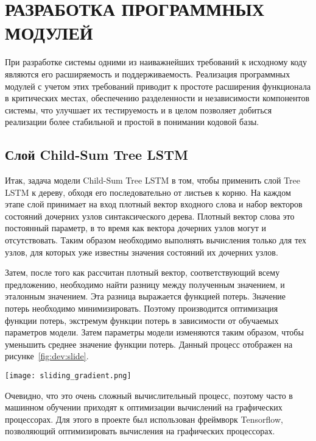 \section{РАЗРАБОТКА ПРОГРАММНЫХ МОДУЛЕЙ}
\label{sec:development}
При разработке системы одними из наиважнейших требований к исходному коду являются его расширяемость и поддерживаемость. Реализация программных модулей с учетом этих требований приводит к простоте расширения функционала в критических местах, обеспечению разделенности и независимости компонентов системы, что улучшает их тестируемость и в целом позволяет добиться реализации более стабильной и простой в понимании кодовой базы.

\subsection{Слой Child-Sum Tree LSTM}
Итак, задача модели Child-Sum Tree LSTM в том, чтобы применить слой Tree LSTM к дереву, обходя его последовательно от листьев к корню. На каждом этапе слой принимает на вход плотный вектор входного слова и набор векторов состояний дочерних узлов синтаксического дерева. Плотный вектор слова это постоянный параметр, в то время как вектора дочерних узлов могут и отсутствовать. Таким образом необходимо выполнять вычисления только для тех узлов, для которых уже известны значения состояний их дочерних узлов.

Затем, после того как рассчитан плотный вектор, соответствующий всему предложению, необходимо найти разницу между полученным значением, и эталонным значением. Эта разница выражается функцией потерь. Значение потерь необходимо минимизировать. Поэтому производится оптимизация функции потерь, экстремум функции потерь в зависимости от обучаемых параметров модели. Затем параметры модели изменяются таким образом, чтобы уменьшить среднее значение функции потерь. Данный процесс отображен на рисунке~\ref{fig:dev:slide}.

\begin{center}
  \texttt{[image: sliding\_gradient.png]}
  \label{fig:dev:slide}
\end{center}

Очевидно, что это очень сложный вычислительный процесс, поэтому часто в машинном обучении приходят к оптимизации вычислений на графических процессорах. Для этого в проекте был использован фреймворк Tensor\-flow, позволяющий оптимизировать вычисления на графических процессорах.

